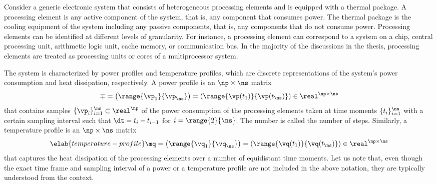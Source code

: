 Consider a generic electronic system that consists of \np heterogeneous
processing elements and is equipped with a thermal package. A processing element
is any active component of the system, that is, any component that consumes
power. The thermal package is the cooling equipment of the system including any
passive components, that is, any components that do not consume power.
Processing elements can be identified at different levels of granularity. For
instance, a processing element can correspond to a system on a chip, central
processing unit, arithmetic logic unit, cache memory, or communication bus. In
the majority of the discussions in the thesis, processing elements are treated
as processing units or cores of a multiprocessor system.

The system is characterized by power profiles and temperature profiles, which
are discrete representations of the system's power consumption and heat
dissipation, respectively. A power profile is an $\np \times \ns$ matrix
\[
  \mp
  = \left(\range{\vp_1}{\vp_\ns}\right)
  = \left(\range{\vp(t_1)}{\vp(t_\ns)}\right) \in \real^{\np \times \ns}
\]
that contains \ns samples $\{ \vp_i \}_{i = 1}^\ns \subset \real^\np$ of the
power consumption of the \np processing elements taken at \ns time moments $\{
t_i \}_{i = 1}^\ns$ with a certain sampling interval \dt such that $\dt = t_i -
t_{i - 1}$ for $i = \range{2}{\ns}$. The number \ns is called the number of
steps. Similarly, a temperature profile is an $\np \times \ns$ matrix
\begin{equation} \elab{temperature-profile}
  \mq
  = \left(\range{\vq_1}{\vq_\ns}\right)
  = \left(\range{\vq(t_1)}{\vq(t_\ns)}\right) \in \real^{\np \times \ns}
\end{equation}
that captures the heat dissipation of the processing elements over a number of
equidistant time moments. Let us note that, even though the exact time frame and
sampling interval of a power or a temperature profile are not included in the
above notation, they are typically understood from the context.
